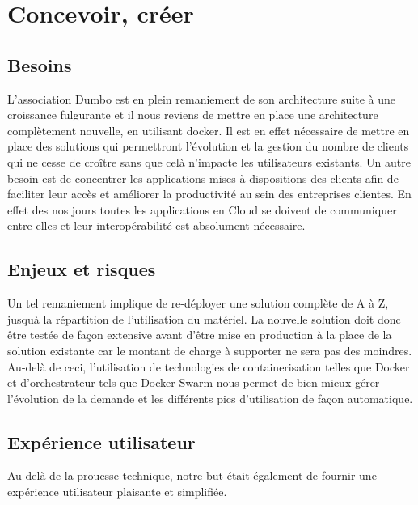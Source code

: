 
\section{Concevoir, créer}

\subsection{Besoins}

L'association Dumbo est en plein remaniement de son architecture suite à une croissance fulgurante et il nous reviens de mettre en place une architecture complètement nouvelle, en utilisant docker.
Il est en effet nécessaire de mettre en place des solutions qui permettront l'évolution et la gestion du nombre de clients qui ne cesse de croître sans que celà n'impacte les utilisateurs existants.
Un autre besoin est de concentrer les applications mises à dispositions des clients afin de faciliter leur accès et améliorer la productivité au sein des entreprises clientes.
En effet des nos jours toutes les applications en Cloud se doivent de communiquer entre elles et leur interopérabilité est absolument nécessaire.

\subsection{Enjeux et risques}

Un tel remaniement implique de re-déployer une solution complète de A à Z, jusquà la répartition de l'utilisation du matériel.
La nouvelle solution doit donc être testée de façon extensive avant d'être mise en production à la place de la solution existante car le montant de charge à supporter ne sera pas des moindres.
Au-delà de ceci, l'utilisation de technologies de containerisation telles que Docker et d'orchestrateur tels que Docker Swarm nous permet de bien mieux gérer l'évolution de la demande et les différents pics d'utilisation de façon automatique.

\subsection{Expérience utilisateur}

Au-delà de la prouesse technique, notre but était également de fournir une expérience utilisateur plaisante et simplifiée.


